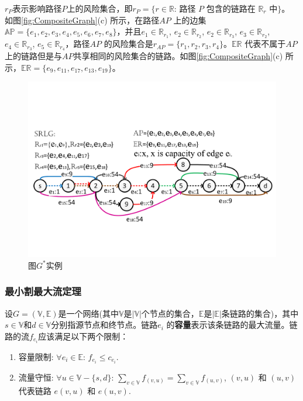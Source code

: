 $r_P$表示影响路径$P$上的风险集合，即$r_P=\{r\in \mathbb{R}$: 路径 $P$ 包含的链路在 $\mathbb{R}_r$ 中$\}$。 如图\ref{fig:CompositeGraph}(c) 所示，在路径$AP$ 上的边集$\mathbb{AP}=\{e_1,e_2,e_3,e_4,e_5,e_6,e_7,e_8\}$，并且$e_1\in \mathbb{R}_{r_1}$, $e_2\in \mathbb{R}_{r_2}$, $e_2\in \mathbb{R}_{r_3}$, $e_3\in \mathbb{R}_{r_2}$, $e_4\in \mathbb{R}_{r_3}$, $e_5\in \mathbb{R}_{r_4}$，路径$AP$ 的风险集合是${r}_{{AP}}=\{r_1, r_2, r_3, r_4\}$。$\mathbb{\mathbb{ER}}$ 代表不属于$AP$上的链路但是与$AP$共享相同的风险集合的链路。如图\ref{fig:CompositeGraph}(c) 所示，$\mathbb{\mathbb{ER}}=\{e_9,e_{11},e_{17},e_{13},e_{19}\}$。

\begin{figure}[tp]
  \centering
  \includegraphics[width=4.5in]{figures/FlowStarGraph}
  \caption{图$G^*$实例}\label{fig:FlowStarGraph}
\end{figure}



\subsubsection{最小割最大流定理}
\label{subsubsec:maxFlow}
设$G=(\mathbb{\mathbb{V}},\mathbb{\mathbb{E}})$是一个网络(其中$\mathbb{\mathbb{V}}$是$|\mathbb{\mathbb{V}}|$个节点的集合，$\mathbb{\mathbb{E}}$是$|\mathbb{\mathbb{E}}|$条链路的集合)，其中$s\in \mathbb{V}$和$d\in \mathbb{V}$分别指源节点和终节点。链路$e_i$ 的\textbf{容量}表示该条链路的最大流量。链路的流$f_{e_i}$应该满足以下两个限制：
\begin{enumerate}
  \item 容量限制: $\forall e_i\in \mathbb{\mathbb{E}}$: $f_{e_i}\leq c_{e_i}$.
  \item 流量守恒: $\forall u\in \mathbb{\mathbb{V}}-\{s,d\}$: $\sum\limits_{v\in \mathbb{V}}f_{(v,u)}=\sum\limits_{v\in \mathbb{V}}f_{(u,v)}$,  $(v,u)$ 和 $(u,v)$ 代表链路 $e(v,u)$ 和 $e(u,v)$.
\end{enumerate}

